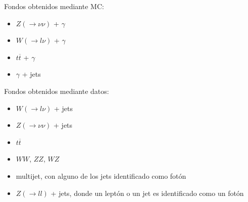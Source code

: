 \documentclass[10pt, compress,spanish]{beamer}
\begin{document}
\begin{frame}[fragile]
\normalsize

\begin{block}{Fondos obtenidos mediante MC:}
\begin{itemize}

  \item $Z(\rightarrow \nu\nu)$ + $\gamma$

  \item $W (\rightarrow l\nu)$ + $\gamma$

  \item $t \overline{t}$ + $\gamma$

  \item $\gamma$ + jets

\end{itemize}
\end{block}

\begin{block}{Fondos obtenidos mediante datos:}
\begin{itemize}

  \item $W (\rightarrow l\nu)$ + jets

  \item $Z (\rightarrow \nu\nu)$ + jets

  \item $t \overline{t}$

  \item $WW$, $ZZ$, $WZ$

  \item multijet, con alguno de los jets identificado como fotón

  \item $Z(\rightarrow ll)$ + jets, donde un leptón o un jet es identificado como un fotón

\end{itemize}
\end{block}


\end{frame}



\end{document}
